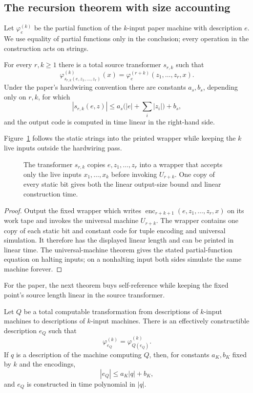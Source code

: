 \subsection{The recursion theorem with size accounting}

Let \(\varphi_e^{(k)}\) be the partial function of the \(k\)-input paper
machine with description \(e\).  We use equality of partial functions only in
the conclusion; every operation in the construction acts on strings.

\begin{lemma}
\label{lem:smn}\enspace%
For every \(r,k\geq1\) there is a total source transformer \(s_{r,k}\) such
that
\[
 \varphi_{s_{r,k}(e,z_1,\ldots,z_r)}^{(k)}(x)
 =\varphi_e^{(r+k)}(z_1,\ldots,z_r,x).
\]
Under the paper's hardwiring convention there are constants
\(a_s,b_s\), depending only on \(r,k\), for which
\[
 |s_{r,k}(e,z)|\leq a_s\bigl(|e|+\textstyle\sum_i|z_i|\bigr)+b_s,
\]
and the output code is computed in time linear in the right-hand side.
\end{lemma}

Figure~\ref{fig:smn-sizes} follows the static strings into the printed wrapper
while keeping the \(k\) live inputs outside the hardwiring pass.
\begin{figure}[t]
\centering

\caption{The transformer \(s_{r,k}\) copies \(e,z_1,\ldots,z_r\) into a wrapper that accepts only the live inputs \(x_1,\ldots,x_k\) before invoking \(U_{r+k}\).  One copy of every static bit gives both the linear output-size bound and linear construction time.}
\label{fig:smn-sizes}
\end{figure}

\begin{proof}
Output the fixed wrapper which writes
\(\operatorname{enc}_{r+k+1}(e,z_1,\ldots,z_r,x)\) on its work tape and invokes
the universal machine \(U_{r+k}\).  The wrapper contains one copy of each
static bit and constant code for tuple encoding and universal simulation.  It
therefore has the displayed linear length and can be printed in linear time.
The universal-machine theorem gives the stated partial-function equation on
halting inputs; on a nonhalting input both sides simulate the same machine
forever.
\end{proof}

For the paper, the next theorem buys self-reference while keeping the fixed
point's source length linear in the source transformer.
\begin{theorem}
\label{thm:kleene-two}\enspace%
Let \(Q\) be a total computable transformation from descriptions of
\(k\)-input machines to descriptions of \(k\)-input machines.  There is an
effectively constructible description \(e_Q\) such that
\[
 \varphi_{e_Q}^{(k)}=\varphi_{Q(e_Q)}^{(k)}.
\tag{10.1}\label{eq:kleene-fixed}
\]
If \(q\) is a description of the machine computing \(Q\), then, for constants
\(a_K,b_K\) fixed by \(k\) and the encodings,
\[
 |e_Q|\leq a_K|q|+b_K,
\]
and \(e_Q\) is constructed in time polynomial in \(|q|\).
\end{theorem}

